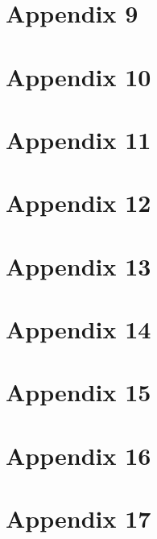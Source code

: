 \chapter{Appendix 9}

\chapter{Appendix 10}

\chapter{Appendix 11}

\chapter{Appendix 12}

\chapter{Appendix 13}

\chapter{Appendix 14}

\chapter{Appendix 15}

\chapter{Appendix 16}

\chapter{Appendix 17}

